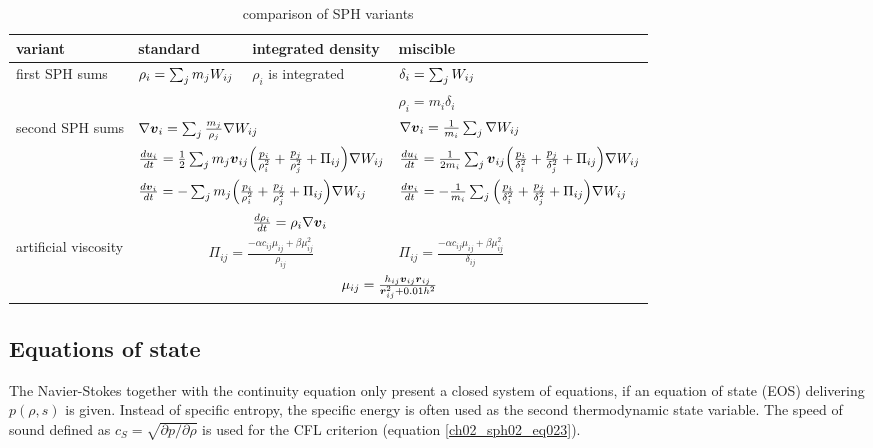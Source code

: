 \begin{landscape}

\begin{table}[htdp]
\begin{center}
\begin{tabular}{|l|l|l|l|}
\hline
variant & standard  & integrated density & miscible \\
\hline \hline
\multirow{2}{3cm}{first SPH sums} & 
\multirow{2}{3cm}{$\rho_i = \sum_{j} m_j W_{ij} $} & 
\multirow{2}{3cm}{$\rho_i$ is integrated }  & 
$ \delta_i = \sum_{j} W_{ij}$ \\
 &
 &
 & 
$\rho_i = m_i \delta_i $ \\
\hline
\multirow{4}{3cm}{second SPH sums} &
\multicolumn{2}{|l|}{$ \nabla \boldsymbol{v}_i = \sum_{j} \frac{m_j}{\rho_j} \nabla W_{ij} $} & 
$ \nabla \boldsymbol{v}_i = \frac{1}{m_i} \sum_{j} \nabla W_{ij} $ \\
& 
\multicolumn{2}{|l|}{$ \frac{du_i}{dt} = \frac{1}{2} \sum_{j} m_{j} \boldsymbol{v}_{ij} \Big( \frac{p_i}{\rho_i^2}  + \frac{p_j}{\rho_j^2} + \Pi_{ij} \Big) \nabla W_{ij} $} & 
$ \frac{du_i}{dt} = \frac{1}{2 m_i} \sum_{j} \boldsymbol{v}_{ij} \Big( \frac{p_i}{\delta_i^2}  + \frac{p_j}{\delta_j^2} + \Pi_{ij} \Big)  \nabla W_{ij} $ \\
& 
\multicolumn{2}{|l|}{$\frac{d \boldsymbol{v}_i }{dt} = - \sum_{j} m_j \Big( \frac{p_i}{\rho_i^2} + \frac{p_j}{\rho_j^2}  +\Pi_{ij} \Big) \nabla W_{ij}$} & 
$\frac{d \boldsymbol{v}_i }{dt} = - \frac{1}{m_i} \sum_{j} \Big( \frac{p_i}{\delta_i^2} + \frac{p_j}{\delta_j^2} + \Pi_{ij} \Big) \nabla W_{ij}$\\
&   
& 
$\frac{d \rho_i}{dt} = \rho_i \nabla \boldsymbol{v}_i$ & \\
\hline
artificial viscosity & \multicolumn{2}{|c|}{$\Pi_{ij} = \frac{- \alpha c_{ij} \mu_{ij} +  \beta \mu_{ij}^2 }{\rho_{ij} } $} & $\Pi_{ij} = \frac{- \alpha c_{ij} \mu_{ij} +  \beta \mu_{ij}^2 }{\delta_{ij} } $ \\
 & \multicolumn{3}{|c|}{$\mu_{ij} = \frac{h_{ij} \boldsymbol{v}_{ij} \boldsymbol{r}_{ij}}{\boldsymbol{r}_{ij}^2+ 0.01h^2} $} \\
\hline
\end{tabular}
\caption{comparison of SPH variants}
\end{center}
\label{default}
\end{table}

\end{landscape}


\subsection{Equations of state}
The Navier-Stokes  together with the continuity equation only present a closed system of equations, if an equation of state (EOS) delivering $p(\rho, s)$ is given. Instead of specific entropy, the specific energy is often used as the second thermodynamic state variable. The speed of sound defined as $c_S = \sqrt{ \partial p / \partial \rho } $ is used for the CFL criterion (equation \ref{ch02_sph02_eq023}).

